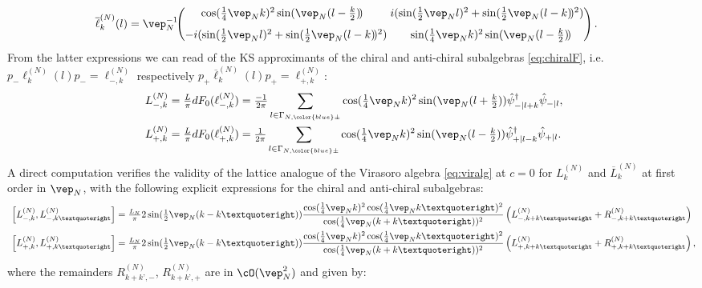 \documentclass[a4paper, 11pt]{article}
\DeclareMathOperator{\1}{\mathds{1}}
\begin{document}
\begin{align}
\label{eq:latviraDantichi}
\overline{\ell}^{(N)}_{k}(l) & = \vep_{N}^{-1}\!\!\begin{pmatrix}\hspace{-0.25cm} \cos(\tfrac{1}{4}\vep_{N}k)^{2}\sin(\vep_{N}(l-\tfrac{k}{2})\!) & \hspace{-0.25cm} i(\sin(\tfrac{1}{2}\vep_{N}l)^{2}+\sin(\tfrac{1}{2}\vep_{N}(l-k)\!)^{2}) \\[0.25cm] -i(\sin(\tfrac{1}{2}\vep_{N}l)^{2}+\sin(\tfrac{1}{2}\vep_{N}(l-k)\!)^{2}) & \sin(\tfrac{1}{4}\vep_{N}k)^{2}\sin(\vep_{N}(l-\tfrac{k}{2})\!) \end{pmatrix}.
\end{align}
From the latter expressions we can read of the KS approximants of the chiral and anti-chiral subalgebras \eqref{eq:chiralF}, i.e.~$p_{-}\ell^{(N)}_{k}(l)p_{-} = \ell^{(N)}_{-,k}$ respectively $p_{+}\overline{\ell}^{(N)}_{k}(l)p_{+} = \ell^{(N)}_{+,k}$:
\begin{align}
\label{eq:latvirasubchi}
L^{(N)}_{-,k} & = \tfrac{L}{\pi}dF_{0}(\ell^{(N)}_{-,k}) = \tfrac{-1}{2\pi}\sum_{l\in\Gamma_{N,{\color{blue}\pm}}}\cos(\tfrac{1}{4}\vep_{N}k)^{2}\sin(\vep_{N}(l+\tfrac{k}{2}))\hat{\psi}_{-|l+k}^{\dag}\hat{\psi}_{-|l}, \\ \nonumber
L^{(N)}_{+,k} & = \tfrac{L}{\pi}dF_{0}(\ell^{(N)}_{+,k}) = \tfrac{1}{2\pi}\sum_{l\in\Gamma_{N,{\color{blue}\pm}}}\cos(\tfrac{1}{4}\vep_{N}k)^{2}\sin(\vep_{N}(l-\tfrac{k}{2}))\hat{\psi}_{+|l-k}^{\dag}\hat{\psi}_{+|l}.
\end{align}
A direct computation verifies the validity of the lattice analogue of the Virasoro algebra \eqref{eq:viralg} at $c=0$ for $L^{(N)}_{k}$ and $\overline{L}^{(N)}_{k}$ at first order in $\vep_{N}$, with the following explicit expressions for the chiral and anti-chiral subalgebras:
\begin{align}
\label{eq:latviraCRchi}
\left[L^{(N)}_{-,k},L^{(N)}_{-,k’}\right] & = \tfrac{L_{N}}{\pi}2\sin(\tfrac{1}{2}\vep_{N}(k-k’))\frac{\cos(\frac{1}{4}\vep_{N}k)^{2}\cos(\frac{1}{4}\vep_{N}k’)^{2}}{\cos(\frac{1}{4}\vep_{N}(k+k’))^{2}}\left(L^{(N)}_{-,k+k’} + R^{(N)}_{-,k+k’}\right) \\ \nonumber
\left[L^{(N)}_{+,k},L^{(N)}_{+,k’}\right] & = \tfrac{L_{N}}{\pi}2\sin(\tfrac{1}{2}\vep_{N}(k-k’))\frac{\cos(\frac{1}{4}\vep_{N}k)^{2}\cos(\frac{1}{4}\vep_{N}k’)^{2}}{\cos(\frac{1}{4}\vep_{N}(k+k’))^{2}}\left(L^{(N)}_{+,k+k’} + R^{(N)}_{+,k+k’}\right),
\end{align}
where the remainders $R^{(N)}_{k+k’,-}$, $R^{(N)}_{k+k’,+}$ are in $\cO(\vep_{N}^{2})$ and given by:
\end{document}
